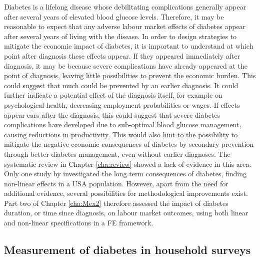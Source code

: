 Diabetes is a lifelong disease whose debilitating complications generally appear after several years of elevated blood glucose levels. Therefore, it may be reasonable to expect that any adverse labour market effects of diabetes appear after several years of living with the disease. In order to design strategies to mitigate the economic impact of diabetes, it is important to understand at which point after diagnosis these effects appear. If they appeared immediately after diagnosis, it may be because severe complications have already appeared at the point of diagnosis, leaving little possibilities to prevent the economic burden. This could suggest that much could be prevented by an earlier diagnosis. It could further indicate a potential effect of the diagnosis itself, for example on psychological health, decreasing employment probabilities or wages. If effects appear ears after the diagnosis, this could suggest that severe diabetes complications have developed due to sub-optimal blood glucose management, causing reductions in productivity. This would also hint to the possibility to mitigate the negative economic consequences of diabetes by secondary prevention through better diabetes management, even without earlier diagnoses. The systematic review in Chapter \ref{cha:review} showed a lack of evidence in this area. Only one study by \textcite{Minor2013} investigated the long term consequences of diabetes, finding non-linear effects in a USA population. However, apart from the need for additional evidence, several possibilities for methodological improvements exist. Part two of Chapter \ref{cha:Mex2} therefore assessed the impact of diabetes duration, or time since diagnosis, on labour market outcomes, using both linear and non-linear specifications in a \ac{FE} framework.   

\subsection{Measurement of diabetes in household surveys}

